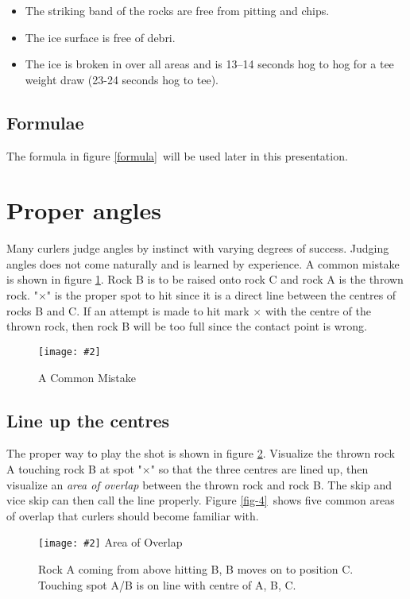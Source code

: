 \documentclass[titlepage,11pt]{article}
\newcommand{\img}[2]{\texttt{[image: \#2]}}
\newcommand{\pict}[4]{%
\begin{figure}[htp]%
    \centering%
	{#4}
    \def\boxX{#3}\ifx\boxX\empty
	\caption{\label{#1} #2}%
    \else
	\caption[#3]{\label{#1} #2}%
    \fi
\end{figure}%
}
\newcommand{\picfileB}[5]{\pict{#1}{#2}{#3}{\img{#4}{#5}}}
\newcommand{\prtfloats}{\clearpage}
\begin{document}
\begin{itemize}
\item The striking band of the rocks are free from pitting and chips.
\item The ice surface is free of debri.
\item The ice is broken in over all areas and is 13--14 seconds hog to hog for a
      tee weight draw (23-24 seconds hog to tee).
\end{itemize}

\subsection*{Formulae}

The formula in figure \ref{formula}\ will be used later in this presentation.

\prtfloats

\section{Proper angles}

Many curlers judge angles by instinct with varying degrees of success. Judging
angles does not come naturally and is learned by experience. A common mistake is
shown in figure \ref{fig-2}. Rock B is to be raised onto rock C and rock A is the thrown
rock. "$\times$" is the proper spot to hit since it is a direct line between the
centres of rocks B and C. If an attempt is made to hit mark $\times$ with the centre of
the thrown rock, then rock B will be too full since the contact point is wrong.

\picfileB{fig-2}{A Common Mistake}{}{width=100mm}{fig02.pdf}

\subsection*{Line up the centres}

The proper way to play the shot is shown in figure \ref{fig-3}. Visualize the thrown rock
A touching rock B at spot "$\times$" so that the three centres are lined up, then
visualize an \emph{area of overlap} between the thrown rock and rock B. The skip
and vice skip can then call the line properly. Figure \ref{fig-4}\ shows five common areas
of overlap that curlers should become familiar with.

\picfileB{fig-3}{Rock A coming from above hitting B, B moves on to position C.
Touching spot A/B is on line with centre of A, B, C.}{Area of Overlap}{height=100mm}{fig03.pdf}
\end{document}
